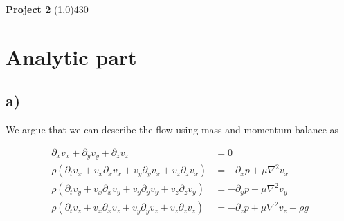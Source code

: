\documentclass{article}
\newcommand{\AssignmentNum}{2}
\begin{document}
    \setlength{\headheight}{23.10004pt}
    \begin{center}
    \LARGE{\bfseries{ Project \AssignmentNum}}
    \line(1,0){430}
    \end{center}

\section{Analytic part}

\subsection*{a)}

We argue that we can describe the flow using mass and momentum balance as

\begin{align}
    \partial_{x} v_{x}+\partial_{y} v_{y}+\partial_{z} v_{z} & =0 \label{eq:a1}\\
    \rho\left(\partial_{t} v_{x}+v_{x} \partial_{x} v_{x}+v_{y} \partial_{y} v_{x}+v_{z} \partial_{z} v_{x}\right) & =-\partial_{x} p+\mu \nabla^{2} v_{x} \label{eq:a2} \\
    \rho\left(\partial_{t} v_{y}+v_{x} \partial_{x} v_{y}+v_{y} \partial_{y} v_{y}+v_{z} \partial_{z} v_{y}\right) & =-\partial_{y} p+\mu \nabla^{2} v_{y} \label{eq:a3} \\
    \rho\left(\partial_{t} v_{z}+v_{x} \partial_{x} v_{z}+v_{y} \partial_{y} v_{z}+v_{z} \partial_{z} v_{z}\right) & =-\partial_{z} p+\mu \nabla^{2} v_{z}-\rho g \label{eq:a4}
\end{align}
\end{document}
